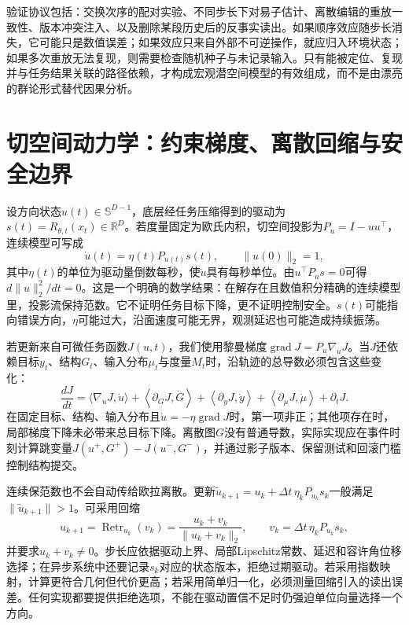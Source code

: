验证协议包括：交换次序的配对实验、不同步长下对易子估计、离散编辑的重放一致性、版本冲突注入、以及删除某段历史后的反事实读出。如果顺序效应随步长消失，它可能只是数值误差；如果效应只来自外部不可逆操作，就应归入环境状态；如果多次重放无法复现，则需要检查随机种子与未记录输入。只有能被定位、复现并与任务结果关联的路径依赖，才构成宏观潜空间模型的有效组成，而不是由漂亮的群论形式替代因果分析。

\section{切空间动力学：约束梯度、离散回缩与安全边界}
\label{sec:tangent_space_dynamics}

设方向状态$u(t)\in\mathbb S^{D-1}$，底层经任务压缩得到的驱动为$s(t)=R_{\theta,t}(x_t)\in\mathbb R^D$。若度量固定为欧氏内积，切空间投影为$P_u=I-uu^\top$，连续模型可写成
\begin{equation}
 \dot u(t)=\eta(t)P_{u(t)}s(t),
 \qquad \|u(0)\|_2=1,
\end{equation}
其中$\eta(t)$的单位为驱动量倒数每秒，使$\dot u$具有每秒单位。由$u^\top P_us=0$可得$d\|u\|_2^2/dt=0$。这是一个明确的数学结果：在解存在且数值积分精确的连续模型里，投影流保持范数。它不证明任务目标下降，更不证明控制安全。$s(t)$可能指向错误方向，$\eta$可能过大，沿面速度可能无界，观测延迟也可能造成持续振荡。

若更新来自可微任务函数$J(u,t)$，我们使用黎曼梯度$\operatorname{grad}J=P_u\nabla_uJ$。当$J$还依赖目标$y_t$、结构$G_t$、输入分布$\mu_t$与度量$M_t$时，沿轨迹的总导数必须包含这些变化：
\begin{equation}
 \frac{dJ}{dt}=\langle\nabla_uJ,\dot u\rangle
 +\left\langle\partial_GJ,\dot G\right\rangle
 +\left\langle\partial_yJ,\dot y\right\rangle
 +\left\langle\partial_\mu J,\dot\mu\right\rangle
 +\partial_tJ.
\end{equation}
在固定目标、结构、输入分布且$\dot u=-\eta\operatorname{grad}J$时，第一项非正；其他项存在时，局部梯度下降未必带来总目标下降。离散图$G$没有普通导数，实际实现应在事件时刻计算跳变量$J(u^+,G^+)-J(u^-,G^-)$，并通过影子版本、保留测试和回滚门槛控制结构提交。

连续保范数也不会自动传给欧拉离散。更新$\tilde u_{k+1}=u_k+\Delta t\,\eta_kP_{u_k}s_k$一般满足$\|\tilde u_{k+1}\|>1$。可采用回缩
\begin{equation}
 u_{k+1}=\operatorname{Retr}_{u_k}(v_k)
 =\frac{u_k+v_k}{\|u_k+v_k\|_2},
 \qquad v_k=\Delta t\,\eta_kP_{u_k}s_k,
\end{equation}
并要求$u_k+v_k\neq0$。步长应依据驱动上界、局部Lipschitz常数、延迟和容许角位移选择；在异步系统中还要记录$s_k$对应的状态版本，拒绝过期驱动。若采用指数映射，计算更符合几何但代价更高；若采用简单归一化，必须测量回缩引入的读出误差。任何实现都要提供拒绝选项，不能在驱动置信不足时仍强迫单位向量选择一个方向。

